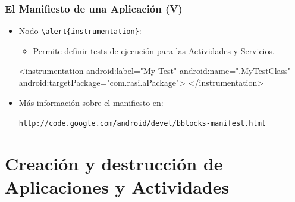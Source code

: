 \documentclass[hyperref={pdfpagelabels=true},ucs]{beamer}
\begin{document}
\begin{frame}[fragile]
\frametitle{El Manifiesto de una Aplicación (V)}  

\begin{itemize}

\item Nodo \Verb|\alert{instrumentation}|:

  \begin{itemize}
  \item Permite definir tests de ejecución para las Actividades
    y Servicios.
  \end{itemize}

\begin{scriptsize}
\begin{block}{}
\begin{xml}
<instrumentation android:label="My Test"
                 android:name=".MyTestClass"
                 android:targetPackage="com.rasi.aPackage">
</instrumentation>
\end{xml}
\end{block}
\end{scriptsize}

\item Más información sobre el manifiesto en:\\
  \begin{scriptsize}
    \Verb|http://code.google.com/android/devel/bblocks-manifest.html|
  \end{scriptsize}
\end{itemize}

\end{frame}



\section{Creación y destrucción de Aplicaciones y Actividades}
\end{document}

